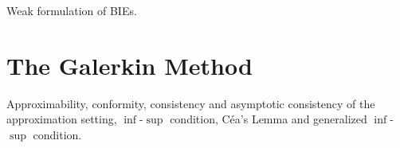 
Weak formulation of \acrshort{BIE}s.\autocite{Hsiao2008-xb}

\section{The Galerkin Method}
Approximability, conformity, consistency and asymptotic consistency
of the approximation setting, $\inf$-$\sup$ condition, Céa's Lemma
and generalized $\inf$-$\sup$ condition.~\autocite{Ern2004-oo,
TesiFilippo}

